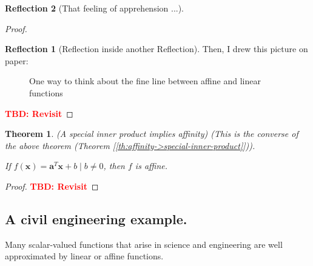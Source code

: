 \documentclass[11pt]{book}
\theoremstyle{definition}
\theoremstyle{plain}
\newtheorem{theorem}{Theorem}
\theoremstyle{problemstyle}
\theoremstyle{remark}
\theoremstyle{definition}
\newtheorem{reflection}{Reflection}
\begin{document}
\begin{reflection}[That feeling of apprehension ...]
\begin{proof}
\begin{reflection}[Reflection inside another Reflection]
            Then, I drew this picture on paper:
            \begin{figure}[H]
                \caption{One way to think about the fine line between affine and linear functions}
                \label{fig:affine-vs-linear}
            \end{figure}
        \end{reflection}
            \textcolor{red}{\textbf{TBD: Revisit}}
    \end{proof}
    \begin{theorem}(A special inner product implies affinity)
        \label{th:special-inner-product->affinity}
        (This is the converse of the above theorem (Theorem [\ref{th:affinity->special-inner-product}])).

        If $f(\boldsymbol{x})=\boldsymbol{a}^T\boldsymbol{x}+b\mid b\ne 0$, then $f$ is affine.
    \end{theorem}
    \begin{proof}
            \textcolor{red}{\textbf{TBD: Revisit}}
    \end{proof}
\end{reflection}

\subsection*{A civil engineering example.} 

Many scalar-valued functions that arise in science and engineering are well approximated by linear or affine functions.







\printbibliography
\end{document}
